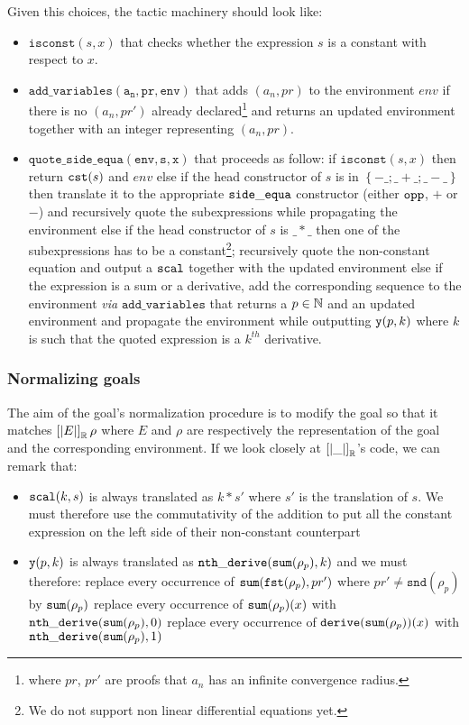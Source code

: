 \documentclass{article}
\begin{document}
Given this choices, the tactic machinery should look like:
\begin{itemize}
\item{$\mathtt{isconst}(s, x)$} that checks whether the expression $s$ is a constant
  with respect to $x$.

\item{$\mathtt{add\_variables(a_n, pr, env)}$} that adds $(a_n, pr)$ to the
  environment $env$ if there is no $(a_n, pr')$ already declared\footnote{where
  $pr$, $pr'$ are proofs that $a_n$ has an infinite convergence radius.}
  and returns an updated environment together with an integer representing
  $(a_n, pr)$.

\item{$\mathtt{quote\_side\_equa(env, s, x)}$} that proceeds as follow:
  \subitem if $\mathtt{isconst}(s, x)$ then return $\operatorname{\mathtt{cst}}(s)$ and $env$
  \subitem else if the head constructor of $s$ is in $\left\lbrace -\_; \_+\_;
   \_-\_\right\rbrace$ then translate it to the appropriate $\operatorname{\mathtt{side\_equa}}$ constructor
   (either $\operatorname{\mathtt{opp}}$, $\plus$ or $\minus$) and recursively quote the subexpressions
    while propagating the environment
  \subitem else if the head constructor of $s$ is $\_*\_$ then one of the
   subexpressions has to be a constant\footnote{We do not support non linear
   differential equations yet.}; recursively quote the non-constant equation and
   output a $\operatorname{\mathtt{scal}}$ together with the updated environment
  \subitem else if the expression is a sum or a derivative, add the corresponding
   sequence to the environment \textit{via} $\mathtt{add\_variables}$ that returns
   a $p \in \mathbb{N}$ and an updated environment and propagate the environment while
   outputting $\operatorname{\mathtt{y}}(p,k)$ where $k$ is such that the quoted expression is a $k^{th}$
   derivative.
\end{itemize}

\subsubsection{Normalizing goals}

The aim of the goal's normalization procedure is to modify the goal so that it
matches $\left[\left| E \right|\right]_{\mathbb{R}} \rho$ where $E$ and $\rho$ are
respectively the representation of the goal and the corresponding environment.
If we look closely at $\left[\left| \_ \right|\right]_{\mathbb{R}}$'s code, we can remark
that:
\begin{itemize}
\item $\operatorname{\mathtt{scal}}(k,s)$ is always translated as $k * s'$ where $s'$ is the
  translation of $s$. We must therefore use the commutativity of the addition
  to put all the constant expression on the left side of their non-constant
  counterpart

\item $\operatorname{\mathtt{y}}(p,k)$ is always translated as $\operatorname{\mathtt{nth\_derive}}(\operatorname{\mathtt{sum}}(\rho_p),k)$ and we must
  therefore:
  \subitem replace every occurrence of $\operatorname{\mathtt{sum}} (\mathtt{fst} (\rho_p), pr')$ where
  $pr' \neq \mathtt{snd}(\rho_p)$ by $\operatorname{\mathtt{sum}}(\rho_p)$
  \subitem replace every occurrence of $\operatorname{\mathtt{sum}} (\rho_p)(x)$ with $\operatorname{\mathtt{nth\_derive}}(\operatorname{\mathtt{sum}}(\rho_p),0)$
  \subitem replace every occurrence of $\mathtt{derive}(\operatorname{\mathtt{sum}} (\rho_p))(x)$ with
  $\operatorname{\mathtt{nth\_derive}}(\operatorname{\mathtt{sum}}(\rho_p),1)$
\end{itemize}
\end{document}
